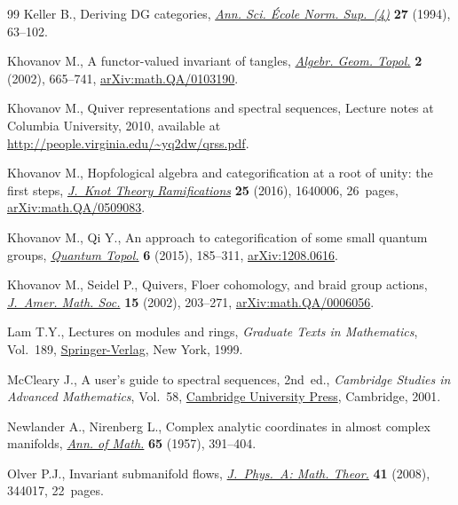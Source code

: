 \documentclass[pdftex]{sigma}
\theoremstyle{definition}
\numberwithin{equation}{section}
\begin{document}
\begin{thebibliography}{99}
Keller B., Deriving {DG} categories, \href{https://doi.org/10.24033/asens.1689}{\textit{Ann. Sci. \'Ecole Norm. Sup.~(4)}} \textbf{27} (1994), 63--102.

Khovanov M., A functor-valued invariant of tangles, \href{https://doi.org/10.2140/agt.2002.2.665}{\textit{Algebr. Geom.
 Topol.}} \textbf{2} (2002), 665--741, \href{https://arxiv.org/abs/math.QA/0103190}{arXiv:math.QA/0103190}.

Khovanov M., Quiver representations and spectral sequences, {L}ecture notes at
 Columbia University, 2010, available at
 \url{http://people.virginia.edu/~yq2dw/qrss.pdf}.

Khovanov M., Hopfological algebra and categorification at a root of unity: the
 first steps, \href{https://doi.org/10.1142/S021821651640006X}{\textit{J.~Knot Theory Ramifications}} \textbf{25} (2016),
 1640006, 26~pages, \href{https://arxiv.org/abs/math.QA/0509083}{arXiv:math.QA/0509083}.

Khovanov M., Qi Y., An approach to categorification of some small quantum
 groups, \href{https://doi.org/10.4171/QT/63}{\textit{Quantum Topol.}} \textbf{6} (2015), 185--311,
 \href{https://arxiv.org/abs/1208.0616}{arXiv:1208.0616}.

Khovanov M., Seidel P., Quivers, {F}loer cohomology, and braid group actions,
 \href{https://doi.org/10.1090/S0894-0347-01-00374-5}{\textit{J.~Amer. Math. Soc.}} \textbf{15} (2002), 203--271, \href{https://arxiv.org/abs/math.QA/0006056}{arXiv:math.QA/0006056}.

Lam T.Y., Lectures on modules and rings, \textit{Graduate Texts in
 Mathematics}, Vol.~189, \href{https://doi.org/10.1007/978-1-4612-0525-8}{Springer-Verlag}, New York, 1999.

McCleary J., A user's guide to spectral sequences, 2nd~ed., \textit{Cambridge Studies in
 Advanced Mathematics}, Vol.~58, \href{https://doi.org/10.1017/CBO9780511626289}{Cambridge University Press}, Cambridge, 2001.

Newlander A., Nirenberg L., Complex analytic coordinates in almost complex
 manifolds, \href{https://doi.org/10.2307/1970051}{\textit{Ann. of Math.}} \textbf{65} (1957), 391--404.

Olver P.J., Invariant submanifold flows, \href{https://doi.org/10.1088/1751-8113/41/34/344017}{\textit{J.~Phys.~A: Math. Theor.}}
 \textbf{41} (2008), 344017, 22~pages.


\end{thebibliography}
\end{document}

